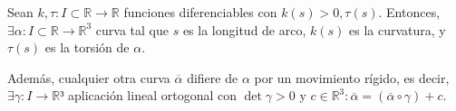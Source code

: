 \begin{theo}
  Sean $k,\tau: I \subset \mathbb{R} \to \mathbb{R}$ funciones diferenciables con $k(s) > 0, \tau(s)$. Entonces, $\exists \alpha  : I \subset \mathbb{R} \to \mathbb{R}^{3}$ curva tal que $s$ es la longitud de arco, $k(s)$ es la curvatura, y $\tau(s)$ es la torsión de $\alpha$.

  Además, cualquier otra curva $\overline{\alpha}$ difiere de $\alpha$ por un movimiento rígido, es decir, $\exists \gamma: I \to \mathbb{R}³$ aplicación lineal ortogonal con $\det \gamma > 0 $ y $c \in \mathbb{R}^{3}: \overline{\alpha} = (\overline{\alpha} \circ \gamma) + c$.
\end{theo}
